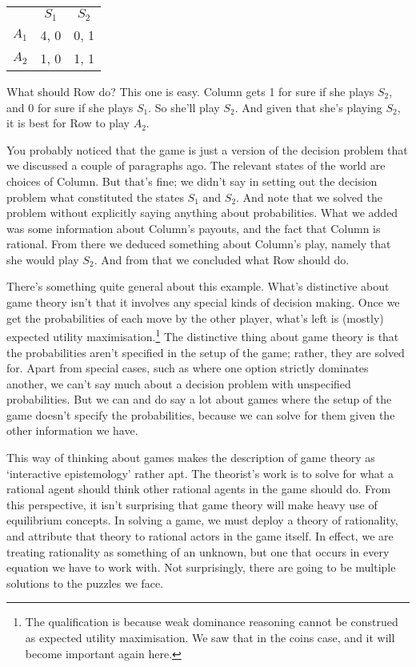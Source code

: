 \documentclass[11pt,]{book}
\let\rmarkdownfootnote\footnote%
\def\footnote{\protect\rmarkdownfootnote}
\def\toprule{}
\def\bottomrule{}
\begin{document}
\begin{longtable}[]{@{}lcc@{}}
\toprule
\endhead
& \(S_1\) & \(S_2\)\tabularnewline
\(A_1\) & 4, 0 & 0, 1\tabularnewline
\(A_2\) & 1, 0 & 1, 1\tabularnewline
\bottomrule
\end{longtable}

What should Row do? This one is easy. Column gets 1 for sure if she plays \(S_2\), and 0 for sure if she plays \(S_1\). So she'll play \(S_2\). And given that she's playing \(S_2\), it is best for Row to play \(A_2\).

You probably noticed that the game is just a version of the decision problem that we discussed a couple of paragraphs ago. The relevant states of the world are choices of Column. But that's fine; we didn't say in setting out the decision problem what constituted the states \(S_1\) and \(S_2\). And note that we solved the problem without explicitly saying anything about probabilities. What we added was some information about Column's payouts, and the fact that Column is rational. From there we deduced something about Column's play, namely that she would play \(S_2\). And from that we concluded what Row should do.

There's something quite general about this example. What's distinctive about game theory isn't that it involves any special kinds of decision making. Once we get the probabilities of each move by the other player, what's left is (mostly) expected utility maximisation.\footnote{The qualification is because weak dominance reasoning cannot be construed as expected utility maximisation. We saw that in the coins case, and it will become important again here.} The distinctive thing about game theory is that the probabilities aren't specified in the setup of the game; rather, they are solved for. Apart from special cases, such as where one option strictly dominates another, we can't say much about a decision problem with unspecified probabilities. But we can and do say a lot about games where the setup of the game doesn't specify the probabilities, because we can solve for them given the other information we have.

This way of thinking about games makes the description of game theory as `interactive epistemology' \citep{Aumann1999} rather apt. The theorist's work is to solve for what a rational agent should think other rational agents in the game should do. From this perspective, it isn't surprising that game theory will make heavy use of equilibrium concepts. In solving a game, we must deploy a theory of rationality, and attribute that theory to rational actors in the game itself. In effect, we are treating rationality as something of an unknown, but one that occurs in every equation we have to work with. Not surprisingly, there are going to be multiple solutions to the puzzles we face.
\end{document}
